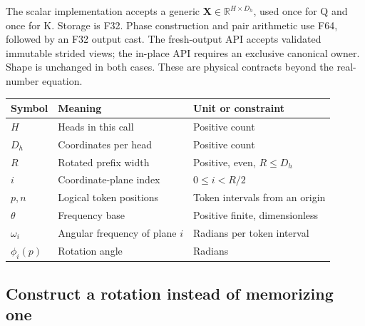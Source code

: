 \documentclass[
  10pt,
]{article}
\newcounter{none} %
\begin{document}
The scalar implementation accepts a generic \(\mathbf{X}\in
\mathbb{R}^{H\times D_h}\), used once for Q and once for K. Storage is
F32. Phase construction and pair arithmetic use F64, followed by an F32
output cast. The fresh-output API accepts validated immutable strided
views; the in-place API requires an exclusive canonical owner. Shape is
unchanged in both cases. These are physical contracts beyond the
real-number equation.

{\def\LTcaptype{none} %
\begin{longtable}[]{@{}
  >{\raggedright\arraybackslash}p{}
  >{\raggedright\arraybackslash}p{}
  >{\raggedright\arraybackslash}p{}@{}}
\toprule\noalign{}
\begin{minipage}[b]{\linewidth}\raggedright
Symbol
\end{minipage} & \begin{minipage}[b]{\linewidth}\raggedright
Meaning
\end{minipage} & \begin{minipage}[b]{\linewidth}\raggedright
Unit or constraint
\end{minipage} \\
\midrule\noalign{}
\endhead
\bottomrule\noalign{}
\endlastfoot
\(H\) & Heads in this call & Positive count \\
\(D_h\) & Coordinates per head & Positive count \\
\(R\) & Rotated prefix width & Positive, even, \(R\le D_h\) \\
\(i\) & Coordinate-plane index & \(0\le i<R/2\) \\
\(p,n\) & Logical token positions & Token intervals from an origin \\
\(\theta\) & Frequency base & Positive finite, dimensionless \\
\(\omega_i\) & Angular frequency of plane \(i\) & Radians per token
interval \\
\(\phi_i(p)\) & Rotation angle & Radians \\
\end{longtable}
}

\subsection{Construct a rotation instead of memorizing
one}\label{construct-a-rotation-instead-of-memorizing-one}
\end{document}
